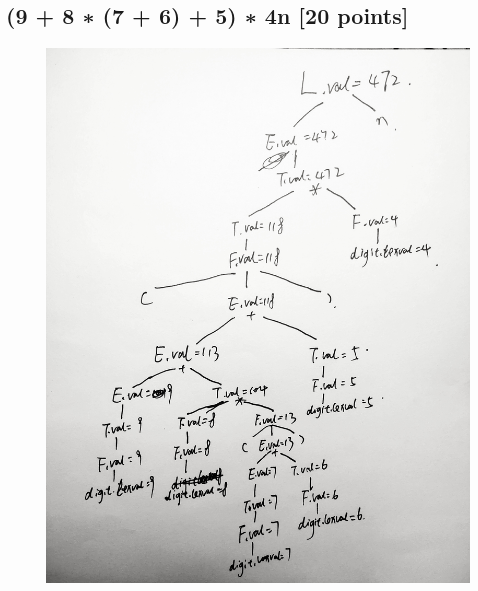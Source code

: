 \documentclass{article}
\begin{document}
        \subsection{(9 + 8 ∗ (7 + 6) + 5) ∗ 4n [20 points]}
        \begin{figure}[H]
            \centering
            \includegraphics[scale=0.15]{./Q1_3.jpg}
            \label{fig:label}
        \end{figure}
\end{document}
